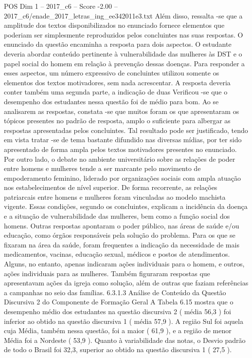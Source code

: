 \begin{textsample}{POS Dim 1 – 2017\_c6 – Score -2.00 – 2017\_c6/enade\_2017\_letras\_ing\_ee342011e3.txt}
Além disso, ressalta -se que a amplitude dos textos disponibilizados no enunciado fornece elementos que poderiam ser simplesmente reproduzidos pelos concluintes nas suas respostas.
O enunciado da questão encaminha a resposta para dois aspectos.
O estudante deveria abordar conteúdo pertinente à vulnerabilidade das mulheres às DST e o papel social do homem em relação à prevenção dessas doenças.
Para responder a esses aspectos, um número expressivo de concluintes utilizou somente os elementos dos textos motivadores, sem nada acrescentar.
A resposta deveria conter também uma segunda parte, a indicação de duas Verificou -se que o desempenho dos estudantes nessa questão foi de médio para bom.
Ao se analisarem as respostas, constata -se que muitos foram os que apresentaram os tópicos presentes no padrão de resposta, amplo o suficiente para albergar as respostas apresentadas pelos concluintes.
Tal resultado pode ser justificado, tendo em vista tratar -se de tema bastante difundido nas diversas mídias, por ter sido apresentado de forma ampla pelos textos motivadores presentes no enunciado.
Por outro lado, o debate no ambiente universitário sobre as relações de poder entre homens e mulheres tende a ser marcante pelo movimento de empoderamento feminino, liderado por organizações sociais com ampla atuação nos estabelecimentos de nível superior.
De forma recorrente, as relações patriarcais entre homens e mulheres foram vinculadas ao modelo machista vigente.
Essas condições, segundo os concluintes, explicam a incidência da doença e a situação de vulnerabilidade das mulheres, bem como a função social dos homens.
Outras respostas apontaram o poder público, nas áreas de saúde e/ou educação, como órgãos responsáveis pela solução do problema.
Para os que se fixaram na área da saúde, foram frequentes a indicação da necessidade de mais medicamentos, vacinas, educação sexual, médicos e postos de atendimentos.
Alguns, no entanto, apenas indicaram ações individuais para o homem, e outros, ações individuais para as mulheres.
Também figuraram respostas que apresentavam ações da igreja como solução, além de outras que faziam referências a campanhas no seio das famílias. 6.3.1.3 Análise de Conteúdo da Questão Discursiva 2 do Componente de Formação Geral A Tabela 6.15 mostra que o desempenho médio dos estudantes na questão discursiva 2 ( média 56,3 ) foi inferior ao obtido na questão discursiva 1 ( média 57,9 ).
A região Sul foi aquela cuja Média, também nessa questão, foi a maior ( 61,9 ), e a região de menor Média foi a Nordeste ( 53,9 ).
Quanto à variabilidade das notas, o Desvio padrão de todo o Brasil foi 32,3, superior ao obtido na questão discursiva 1 ( 27,5 ).

\end{textsample}

